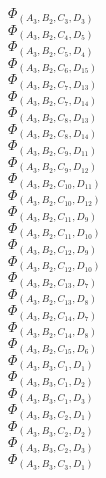 \documentclass[14pt]{article}
\begin{document}
    $\Phi_{({A}_{3}, {B}_{2}, {C}_{3}, {D}_{3})}$ \\ 
    $\Phi_{({A}_{3}, {B}_{2}, {C}_{4}, {D}_{5})}$ \\ 
    $\Phi_{({A}_{3}, {B}_{2}, {C}_{5}, {D}_{4})}$ \\ 
    $\Phi_{({A}_{3}, {B}_{2}, {C}_{6}, {D}_{15})}$ \\ 
    $\Phi_{({A}_{3}, {B}_{2}, {C}_{7}, {D}_{13})}$ \\ 
    $\Phi_{({A}_{3}, {B}_{2}, {C}_{7}, {D}_{14})}$ \\ 
    $\Phi_{({A}_{3}, {B}_{2}, {C}_{8}, {D}_{13})}$ \\ 
    $\Phi_{({A}_{3}, {B}_{2}, {C}_{8}, {D}_{14})}$ \\ 
    $\Phi_{({A}_{3}, {B}_{2}, {C}_{9}, {D}_{11})}$ \\ 
    $\Phi_{({A}_{3}, {B}_{2}, {C}_{9}, {D}_{12})}$ \\ 
    $\Phi_{({A}_{3}, {B}_{2}, {C}_{10}, {D}_{11})}$ \\ 
    $\Phi_{({A}_{3}, {B}_{2}, {C}_{10}, {D}_{12})}$ \\ 
    $\Phi_{({A}_{3}, {B}_{2}, {C}_{11}, {D}_{9})}$ \\ 
    $\Phi_{({A}_{3}, {B}_{2}, {C}_{11}, {D}_{10})}$ \\ 
    $\Phi_{({A}_{3}, {B}_{2}, {C}_{12}, {D}_{9})}$ \\ 
    $\Phi_{({A}_{3}, {B}_{2}, {C}_{12}, {D}_{10})}$ \\ 
    $\Phi_{({A}_{3}, {B}_{2}, {C}_{13}, {D}_{7})}$ \\ 
    $\Phi_{({A}_{3}, {B}_{2}, {C}_{13}, {D}_{8})}$ \\ 
    $\Phi_{({A}_{3}, {B}_{2}, {C}_{14}, {D}_{7})}$ \\ 
    $\Phi_{({A}_{3}, {B}_{2}, {C}_{14}, {D}_{8})}$ \\ 
    $\Phi_{({A}_{3}, {B}_{2}, {C}_{15}, {D}_{6})}$ \\ 
    $\Phi_{({A}_{3}, {B}_{3}, {C}_{1}, {D}_{1})}$ \\ 
    $\Phi_{({A}_{3}, {B}_{3}, {C}_{1}, {D}_{2})}$ \\ 
    $\Phi_{({A}_{3}, {B}_{3}, {C}_{1}, {D}_{3})}$ \\ 
    $\Phi_{({A}_{3}, {B}_{3}, {C}_{2}, {D}_{1})}$ \\ 
    $\Phi_{({A}_{3}, {B}_{3}, {C}_{2}, {D}_{2})}$ \\ 
    $\Phi_{({A}_{3}, {B}_{3}, {C}_{2}, {D}_{3})}$ \\ 
    $\Phi_{({A}_{3}, {B}_{3}, {C}_{3}, {D}_{1})}$ \\ 
\end{document}
